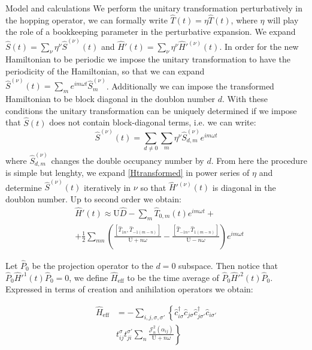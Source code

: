 \documentclass[aps,prl,twocolumn,amsmath,amssymb,superscriptaddress,nobibnotes]{revtex4}%
\newcommand{\n}{\nonumber}
\begin{document}
\begin{section}{Model and calculations}
We perform the unitary transformation perturbatively in the hopping operator, we can formally write $\hat{T}(t) = \eta \hat{T}(t)$, where $\eta$ will play the role of a bookkeeping parameter in the perturbative expansion. We expand $\hat{S}(t) = \sum_\nu \eta^\nu \hat{S}^{(\nu)}(t)$ and $\hat{H}'(t) = \sum_\nu \eta^\nu \hat{H}'^{(\nu)}(t)$. In order for the new Hamiltonian to be periodic we impose the unitary transformation to have the periodicity of the Hamiltonian, so that we can expand $\hat{S}^{(\nu)}(t) = \sum_m e^{im\omega t}\hat{S}^{(\nu)}_m$. Additionally we can impose the transformed Hamiltonian to be block diagonal in the doublon number $d$. With these conditions the unitary transformation can be uniquely determined if we impose that $\hat{S}(t)$ does not contain block-diagonal terms, i.e. we can write:
\begin{equation}
\hat{S}^{(\nu)}(t) = \sum_{d \neq 0} \sum_m \eta^\nu \hat{S}^{(\nu)}_{d,m} e^{im\omega t}
\end{equation}
where $\hat{S}^{(\nu)}_{d,m}$ changes the double occupancy number by $d$. From here the procedure is simple but lenghty, we expand \ref{Htransformed} in power series of $\eta$ and determine $\hat{S}^{(\nu)}(t)$ iteratively in $\nu$ so that $\hat{H}'^{(\nu)}(t)$ is diagonal in the doublon number. Up to second order we obtain:
\begin{align}
&\hat{H}'(t) \approx \text{U}\hat{D} - \sum_m \hat{T}_{0,m}(t)e^{im\omega t} + \n \\
&+ \frac{1}{2}\sum_{mn} \left( \frac{\left[\hat{T}_{1n}, \hat{T}_{-1(m-n)} \right]}{\text{U}+n\omega} - \frac{\left[\hat{T}_{-1n}, \hat{T}_{1(m-n)} \right]}{\text{U}-n\omega} \right) e^{im\omega t}
\end{align}

Let $\hat{P}_0$ be the projection operator to the $d=0$ subspace. Then notice that $\hat{P}_0\hat{H}'^{1}(t)\hat{P}_0 = 0$, we define $\hat{H}_{\text{eff}}$ to be the time average of $\hat{P}_0\hat{H}'^{2}(t)\hat{P}_0$. Expressed in terms of creation and anihilation operators we obtain:

\begin{align}
\hat{H}_{\text{eff}} &= - \sum_{i,j, \sigma, \sigma'} \left\{ \hat{c}_{i \sigma}^\dagger \hat{c}_{j \sigma} \hat{c}_{j \sigma'}^\dagger \hat{c}_{i \sigma'} \right. \n \\
&t_{ij}^{\sigma} t_{ji}^{\sigma'} \sum_{n} \frac{\mathcal{J}_{n}^2(\alpha_{ij})}{\text{U}+n\omega} \left. \right\} \label{GeneralHeff}
\end{align}


\end{section}
\end{document}
